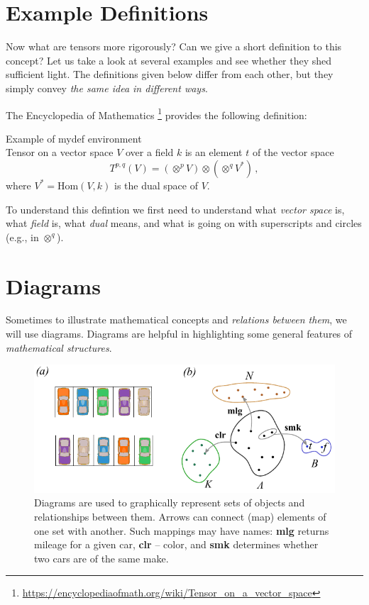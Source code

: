\section{Example Definitions}\label{sec:ExampleDefinitions}
Now what are tensors more rigorously? Can we give a short definition
to this concept?
Let us take a look at several examples and see whether they shed
sufficient light. The definitions given below differ from each other,
but they simply convey \emph{the same idea in different ways}.

The Encyclopedia of Mathematics
\footnote{\url{https://encyclopediaofmath.org/wiki/Tensor_on_a_vector_space}}
provides the following definition:

\begin{mydef}{Example of mydef environment}\\
  \small
Tensor on a vector space $V$ over a field $k$ is an element $t$ of the
vector space
\begin{equation*}
	T^{p,q} (V) = (\otimes^p V)\otimes (\otimes^q V^*)\,,
\end{equation*}
where $V^*=\textrm{Hom}(V, k)$ is the dual space of $V$.
\label{tcb:tensorDefinition1}
\end{mydef}
To understand this defintion we first need to understand what
\emph{vector space} is, what \emph{field} is, what \emph{dual} means,
and what is going on with superscripts and circles (e.g., in
$\otimes^q$).


\section{Diagrams}
Sometimes to illustrate mathematical concepts and \emph{relations between them},
we will use diagrams. Diagrams are helpful in highlighting
some general features of \emph{mathematical structures}.

\begin{figure}[htbp]
  \centering
  \includegraphics[scale=1.0]{diagrams}
  \caption{Diagrams are used to graphically represent sets of objects
    and relationships between them. Arrows can connect (map) elements
    of one set with another. Such mappings may have names: {\bf mlg}
    returns mileage for a given car, {\bf clr} -- color, and {\bf smk}
  determines whether two cars are of the same make.}
  \label{fig:diagrams}
\end{figure}

